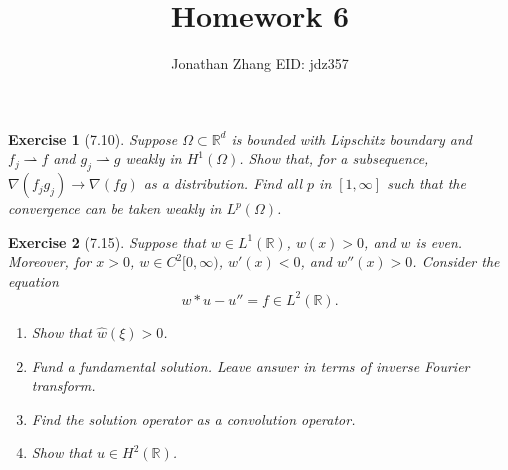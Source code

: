\documentclass[letterpaper,twoside,11pt]{article}
\theoremstyle{mystyle}
\newtheorem*{exercise}{Exercise}
\newcommand{\R}{{\mathbb R}}
\begin{document}
\title{\vspace{-2\baselineskip} 
Homework 6
}
\author{Jonathan Zhang \qquad EID: { jdz357} }
\date{}
\maketitle



\begin{exercise}[7.10]
Suppose $\Omega\subset \R^d$ is bounded with Lipschitz boundary and $f_j \rightharpoonup f$ and $g_j\rightharpoonup g$ weakly in $H^1\left( \Omega \right)$. Show that, for a subsequence, $\nabla \left( f_jg_j \right) \to \nabla (fg)$ as a distribution. Find all $p$ in $[1,\infty]$ such that the convergence can be taken weakly in $L^p\left( \Omega \right)$. 
\end{exercise}







\begin{exercise}[7.15]
Suppose that $w \in L^1\left( \R \right)$, $w(x) > 0$, and $w$ is even. Moreover, for $x > 0$, $w \in C^2[0, \infty)$, $w'(x) < 0$, and $w''(x) >0$. Consider the equation 
\[w\ast u - u'' = f\in L^2\left( \R \right).\]
\begin{enumerate}
  \item Show that $\hat w \left( \xi \right) >0$. 
  \item Fund a fundamental solution. Leave answer in terms of inverse Fourier transform. 
  \item Find the solution operator as a convolution operator. 
  \item Show that $u \in H^2\left( \R \right)$. 
\end{enumerate}
\end{exercise}
\end{document}

